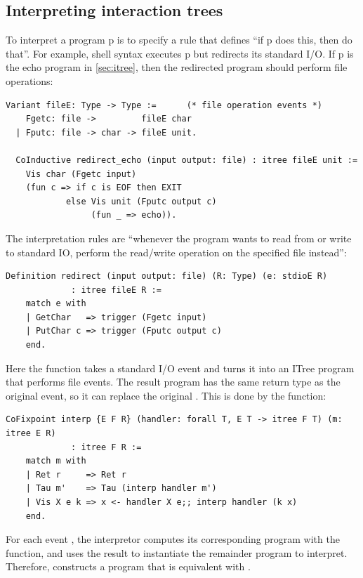 \subsection{Interpreting interaction trees}
To interpret a program \ilc p is to specify a rule that defines ``if \ilc p does
this, then do that''.  For example, shell syntax 
executes \ilc p but redirects its standard I/O.  If \ilc p is the echo program
in \autoref{sec:itree}, then the redirected program should perform file
operations:
\begin{lstlisting}[style=customcoq]
  Variant fileE: Type -> Type :=      (* file operation events *)
    Fgetc: file ->         fileE char
  | Fputc: file -> char -> fileE unit.

  CoInductive redirect_echo (input output: file) : itree fileE unit :=
    Vis char (Fgetc input)
    (fun c => if c is EOF then EXIT
            else Vis unit (Fputc output c)
                 (fun _ => echo)).
\end{lstlisting}

The interpretation rules are ``whenever the program wants to read from or write
to standard IO, perform the read/write operation on the specified file
instead'':
\begin{lstlisting}[style=customcoq]
  Definition redirect (input output: file) (R: Type) (e: stdioE R)
             : itree fileE R :=
    match e with
    | GetChar   => trigger (Fgetc input)
    | PutChar c => trigger (Fputc output c)
    end.
\end{lstlisting}

Here the  function takes a standard I/O event and turns it into an
ITree program that performs file events.  The result program has the same return
type as the original event, so it can replace the original .  This
is done by the  function:
\begin{lstlisting}[style=customcoq]
  CoFixpoint interp {E F R} (handler: forall T, E T -> itree F T) (m: itree E R)
             : itree F R :=
    match m with
    | Ret r     => Ret r
    | Tau m'    => Tau (interp handler m')
    | Vis X e k => x <- handler X e;; interp handler (k x)
    end.
\end{lstlisting}

For each event , the interpretor computes its corresponding
program with the  function, and uses the result  to
instantiate the remainder program to interpret.  Therefore,  constructs a program that is equivalent with
.

